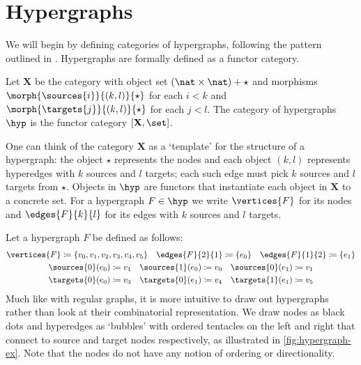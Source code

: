 \section{Hypergraphs}

We will begin by defining categories of hypergraphs, following the
pattern outlined in \cite{bonchi2022string}.
Hypergraphs are formally defined as a functor category.

\begin{definition}\label{def:hypergraph}
    Let \(\mathbf{X}\) be the category with object set
    \((\nat \times \nat) + \star\) and morphisms
    \(\morph{\sources{i}}{(k,l)}{\star}\) for each \(i < k\)
    and \(\morph{\targets{j}}{(k,l)}{\star}\) for each \(j < l\).
    The category of hypergraphs \(\hyp\) is the functor category
    \([\mathbf{X}, \set]\).
\end{definition}

One can think of the category \(\mathbf{X}\) as a `template' for the structure
of a hypergraph: the object \(\star\) represents the nodes and each object
\((k, l)\) represents hyperedges with \(k\) sources and \(l\) targets; each such
edge must pick \(k\) sources and \(l\) targets from \(\star\).
Objects in \(\hyp\) are functors that instantiate each object in \(\mathbf{X}\)
to a concrete set.
For a hypergraph \(F \in \hyp\) we write \(\vertices{F}\) for its nodes and
\(\edges{F}{k}{l}\) for its edges with \(k\) sources and \(l\) targets.

\begin{example}\label{ex:hypergraph}
    Let a hypergraph \(F\) be defined as follows:
    \begin{gather*}
        \vertices{F} \coloneqq \{v_0,v_1,v_2,v_3,v_4,v_5\}
        \quad
        \edges{F}{2}{1} \coloneqq \{e_0\}
        \quad
        \edges{F}{1}{2} \coloneqq \{e_1\}
        \\
        \sources{0}(e_0) \coloneqq v_1
        \quad
        \sources{1}(e_0) \coloneqq v_0
        \quad
        \sources{0}(e_1) \coloneqq v_1
        \\
        \targets{0}(e_0) \coloneqq v_3
        \quad
        \targets{0}(e_1) \coloneqq v_4
        \quad
        \targets{1}(e_1) \coloneqq v_5
    \end{gather*}
    Much like with regular graphs, it is more intuitive to draw out hypergraphs
    rather than look at their combinatorial representation.
    We draw nodes as black dots and hyperedges as `bubbles' with ordered tentacles
    on the left and right that connect to source and target nodes respectively,
    as illustrated in \cref{fig:hypergraph-ex}.
    Note that the nodes do not have any notion of ordering or directionality.
\end{example}

